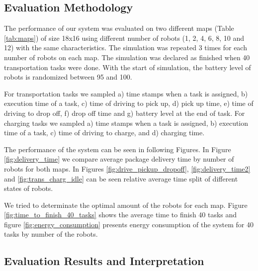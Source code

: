 \documentclass[journal]{IEEEtran}
\begin{document}
\subsection{Evaluation Methodology}
\label{evaluation_methodology}
The performance of our system was evaluated on two different maps (Table \ref{tab:maps}) of size 18x16 using different number of robots (1, 2, 4, 6, 8, 10 and 12) with the same characteristics. The simulation was repeated 3 times for each number of robots on each map. The simulation was declared as finished when 40 transportation tasks were done. With the start of simulation, the battery level of robots is randomized between 95 and 100.

For transportation tasks we sampled a) time stamps when a task is assigned, b) execution time of a task, c) time of driving to pick up, d) pick up time, e) time of driving to drop off, f) drop off time and g) battery level at the end of task. For charging tasks we sampled  a) time stamps when a task is assigned, b) execution time of a task, c) time of driving to charge, and d) charging time.

The performance of the system can be seen in following Figures. In Figure \ref{fig:delivery_time} we compare average package delivery time by number of robots for both maps. In Figures \ref{fig:drive_pickup_dropoff}, \ref{fig:delivery_time2} and \ref{fig:trans_charg_idle} can be seen relative average time split of different states of robots.

We tried to determinate the optimal amount of the robots for each map. Figure \ref{fig:time_to_finish_40_tasks} shows the average time to finish 40 tasks and figure \ref{fig:energy_consumption} presents energy consumption of the system for 40 tasks by number of the robots.

\subsection{Evaluation Results and Interpretation}
\end{document}

